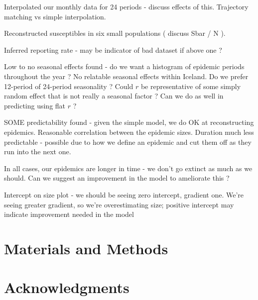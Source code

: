\documentclass[10pt]{article}
\begin{document}
Interpolated our monthly data for 24 periods - discuss effects of this. Trajectory matching vs simple interpolation.

Reconstructed susceptibles in six small populations ( discuss Sbar / N ).

Inferred reporting rate - may be indicator of bad dataset if above one ?

Low to no seasonal effects found - do we want a histogram of epidemic periods throughout the year ? No relatable seasonal effects within Iceland. Do we prefer 12-period of 24-period seasonality ? Could $r$ be representative of some simply random effect that is not really a seasonal factor ? Can we do as well in predicting using flat $r$ ?

SOME predictability found - given the simple model, we do OK at reconstructing epidemics. Reasonable correlation between the epidemic sizes. Duration much less predictable - possible due to how we define an epidemic and cut them off as they run into the next one.

In all cases, our epidemics are longer in time - we don't go extinct as much as we should. Can we suggest an improvement in the model to ameliorate this ?

Intercept on size plot - we should be seeing zero intercept, gradient one. We're seeing greater gradient, so we're overestimating size; positive intercept may indicate improvement needed in the model










\section*{Materials and Methods}











\section*{Acknowledgments}
\end{document}
